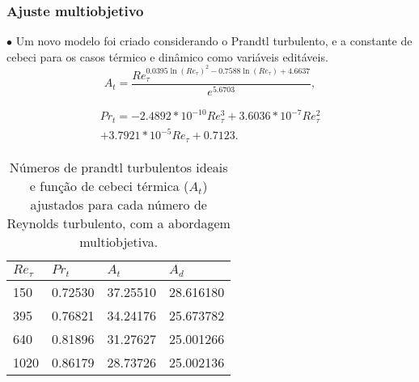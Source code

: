 \documentclass[xcolor=dvipsnames,10pt,aspectratio=169]{beamer}
\begin{document}
    \begin{frame}
		\frametitle{Ajuste multiobjetivo}
		\begin{minipage}[h!]{0.45\textwidth}
      $\bullet$ Um novo modelo foi criado considerando o Prandtl turbulento, e a constante de cebeci para os casos térmico e dinâmico como variáveis editáveis.
      \begin{equation}
        A_t = \frac{Re_\tau ^{0.0395 \ln(Re_\tau)^2 - 0.7588 \ln(Re_\tau) +  4.6637  } }{e ^{5.6703}},
      \end{equation}

      \begin{equation}
        \begin{split}
          Pr_t = -2.4892 * 10^{-10} Re_\tau^3 +  3.6036 * 10^{-7} Re_\tau^2\\
          + 3.7921 *10 ^{-5} Re_\tau + 0.7123 .
        \end{split}
      \end{equation}

		\end{minipage}\hfill
		\begin{minipage}[h!]{0.45\textwidth}
      \begin{table}[!h]
        \centering
        \caption{Números de prandtl turbulentos ideais e função de cebeci térmica ($A_t$) ajustados para cada número de Reynolds turbulento, com a abordagem multiobjetiva.}
        \begin{tabular}{llll}
          \hline
          $Re_\tau$ & $Pr_t$ & $A_t$ & $A_d$\\
          \hline
          150  &   0.72530 & 37.25510 & 28.616180\\
          395  &   0.76821 & 34.24176 & 25.673782\\
          640  &   0.81896 & 31.27627 & 25.001266\\
          1020 &   0.86179 & 28.73726 & 25.002136\\ 
          \hline
        \end{tabular}
      \end{table}
		\end{minipage}
		\end{frame}
	
\end{document}
